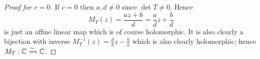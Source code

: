 \begin{proof}[Proof for $c = 0$]
    If $c = 0$ then $a, d \neq 0$ since $\det{T} \neq 0$. Hence
    \[ M_T(z) = \frac{az + b}{d} = \frac ad z + \frac bd \]
    is just an affine linear map which is of course holomorphic. It is also clearly a bijection with inverse $M^{-1}_T(z) = \frac da z - \frac ba$ which is also clearly holomorphic; hence $M_T: \mathbb{C} \xrightarrow{\sim} \mathbb{C}$.
\end{proof}
